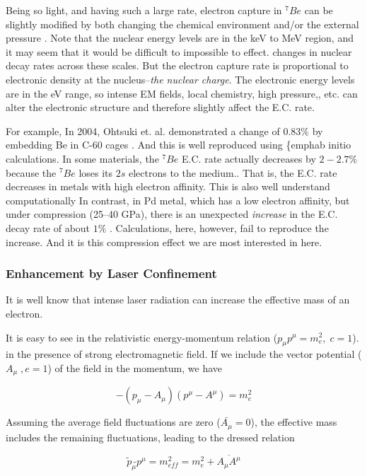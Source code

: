 \documentclass[%
 aip,
 jmp,%
 amsmath,amssymb,
 reprint,%
]{revtex4-1}
\begin{document}
Being so light, and having such a large rate, electron capture in $^{7}Be$ can be slightly modified by both changing the chemical environment and/or the external pressure \cite{Segre021947, emery,wang,raydas,ohtsuki}. Note that the nuclear energy levels are in the keV to MeV region, and it may seem that it would be difficult to impossible to effect. changes in nuclear decay rates across these scales.  But the electron capture rate is proportional to electronic density at the nucleus--\emph{the nuclear charge}.  
 The electronic energy levels are in the eV range, so intense EM fields, local chemistry, high pressure,, etc. can alter the electronic structure and therefore slightly affect the E.C. rate. 

For example, In 2004, Ohtsuki et. al. demonstrated a change of $0.83\%$  by embedding Be in C-60 cages \cite{ohtsuki}.  And this is well reproduced using \{emph{ab initio} calculations.  In some materials, the $^{7}Be$ E.C. rate actually decreases by $2-2.7\%$ because the $^{7}Be$ loses its $2s$ electrons to the medium.\cite{PhysRevC.71.025801}. That is, the E.C. rate decreases in metals with high electron affinity. This is also well understand computationally  In contrast, in Pd metal, which has a low electron affinity, but under compression (25–40 GPa), there is an unexpected \emph{increase} in the E.C. decay rate of about $1\%$ \cite{PhysRevC.101.035801}.  Calculations, here, however, fail to reproduce the increase.  And it is this compression effect we are most interested in here.

\subsubsection{Enhancement by Laser Confinement}

It is well know that intense laser radiation can increase the effective mass of an electron.

It is easy to see in the relativistic energy-momentum relation ($p_{\mu}p^{\mu}=m_{e}^{2},\;c=1$). in the presence of strong electromagnetic field.  
If we include the vector potential ($A_{\mu}\;,e=1$) of the field in the momentum, we have

$$-(p_{\mu}-A_{\mu})(p^{\mu}-A^{\mu})=m_{e}^{2}$$

Assuming the average field fluctuations are zero ($\bar{A_{\mu}}=0$), the effective mass includes the remaining fluctuations, leading to the dressed relation

$$\tilde{p}_{\mu}\tilde{}p^{\mu}=m_{eff}^{2}=m_{e}^{2}+\overline{A_{\mu}A^{\mu}}$$
\end{document}
